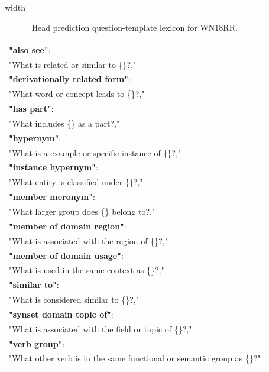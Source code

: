\documentclass[11pt]{article}
\begin{document}
\begin{table}[ht]
  \centering
  \begin{adjustbox}{width=\linewidth}
  \begin{tabular}{|p{1.0\linewidth}|}
    \hline
    {\footnotesize\ttfamily\raggedright\sloppy
\textbf{\# head\_prediction:}\\
\textbf{"also see"}: \\
"What is related or similar to \{\}?,"\\
\textbf{"derivationally related form"}: \\
"What word or concept leads to \{\}?,"\\
\textbf{"has part"}: \\
"What includes \{\} as a part?,"\\
\textbf{"hypernym"}: \\
"What is a example or specific instance of \{\}?,"\\
\textbf{"instance hypernym"}: \\
"What entity is classified under \{\}?,"\\
\textbf{"member meronym"}: \\
"What larger group does \{\} belong to?,"\\
\textbf{"member of domain region"}: \\
"What is associated with the region of \{\}?,"\\
\textbf{"member of domain usage"}: \\
"What is used in the same context as \{\}?,"\\
\textbf{"similar to"}: \\
"What is considered similar to \{\}?,"\\
\textbf{"synset domain topic of"}: \\
"What is associated with the field or topic of \{\}?,"\\
\textbf{"verb group"}: \\
"What other verb is in the same functional or semantic group as \{\}?"
    }\\ \hline
  \end{tabular}
  \end{adjustbox}
  \caption{Head prediction question-template lexicon for WN18RR.}
  \label{tab:head_prediction_templates_wn}
\end{table}
\end{document}
